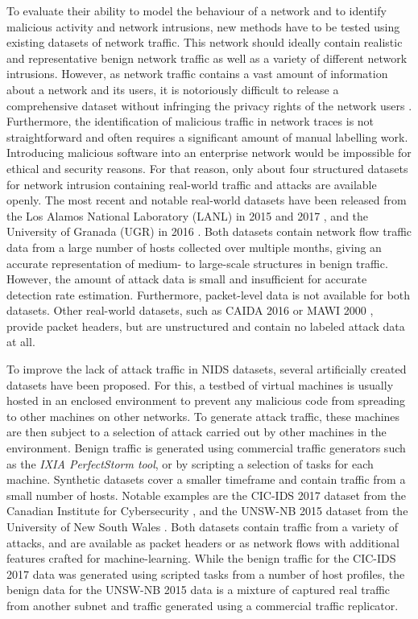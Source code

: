 To evaluate their ability to model the behaviour of a network and to identify malicious activity and network intrusions, new methods have to be tested using existing datasets of network traffic. This network should ideally contain realistic and representative benign network traffic as well as a variety of different network intrusions. However, as network traffic contains a vast amount of information about a network and its users, it is notoriously difficult to release a comprehensive dataset without infringing the privacy rights of the network users \cite{sperotto2009labeled}. Furthermore, the identification of malicious traffic in network traces is not straightforward and often requires a significant amount of manual labelling work. Introducing malicious software into an enterprise network would be impossible for ethical and security reasons. For that reason, only about four structured datasets for network intrusion containing real-world traffic and attacks are available openly. The most recent and notable real-world datasets have been released from the Los Alamos National Laboratory (LANL) in 2015 and 2017 \cite{akent-2015-enterprise-data, turcotte17}, and the University of Granada (UGR) in 2016 \cite{macia2018ugr}. Both datasets contain network flow traffic data from a large number of hosts collected over multiple months, giving an accurate representation of medium- to large-scale structures in benign traffic. However, the amount of attack data is small and insufficient for accurate detection rate estimation. Furthermore, packet-level data is not available for both datasets. Other real-world datasets, such as CAIDA 2016 \cite{walsworth2015caida} or MAWI 2000 \cite{sony2000traffic}, provide packet headers, but are unstructured and contain no labeled attack data at all.

To improve the lack of attack traffic in NIDS datasets, several artificially created datasets have been proposed. For this, a testbed of virtual machines is usually hosted in an enclosed environment to prevent any malicious code from spreading to other machines on other networks. To generate attack traffic, these machines are then subject to a selection of attack carried out by other machines in the environment. Benign traffic is generated using commercial traffic generators such as the \emph{IXIA PerfectStorm tool}, or by scripting a selection of tasks for each machine. Synthetic datasets cover a smaller timeframe and contain traffic from a small number of hosts. Notable examples are the CIC-IDS 2017 dataset from the Canadian Institute for Cybersecurity \cite{sharafaldin2018towards}, %
and the UNSW-NB 2015 dataset from the University of New South Wales \cite{moustafa_unsw-nb15:_2015}. Both datasets contain traffic from a variety of attacks, and are available as packet headers or as network flows with additional features crafted for machine-learning. While the benign traffic for the CIC-IDS 2017 data was generated using scripted tasks from a number of host profiles, the benign data for the UNSW-NB 2015 data is a mixture of captured real traffic from another subnet and traffic generated using a commercial traffic replicator. 



